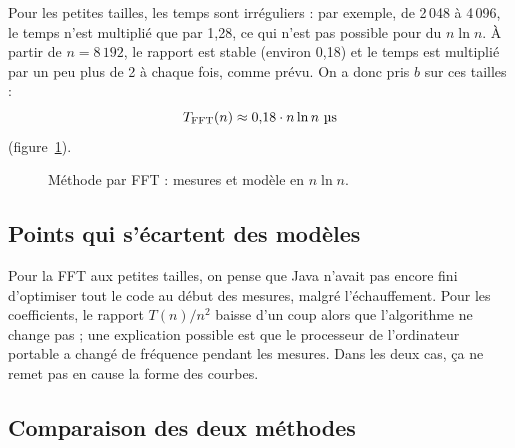 \documentclass[11pt,a4paper]{article}
\begin{document}
Pour les petites tailles, les temps sont irréguliers : par exemple, de 2\,048 à
4\,096, le temps n'est multiplié que par 1,28, ce qui n'est pas possible pour du
$n \ln n$. À partir de $n = 8\,192$, le rapport est stable (environ 0,18) et le temps
est multiplié par un peu plus de 2 à chaque fois, comme prévu. On a donc pris $b$ sur
ces tailles :
\[
  T_{\text{FFT}}(n) \approx 0{,}18 \cdot n \ln n \ \text{\textmu s}
\]
(figure~\ref{fig:fft}).

\begin{figure}[H]
\centering
{}
\caption{Méthode par FFT : mesures et modèle en $n \ln n$.}
\label{fig:fft}
\end{figure}

\subsection{Points qui s'écartent des modèles}
\label{sec:ecarts}

Pour la FFT aux petites tailles, on pense que Java n'avait pas encore fini
d'optimiser tout le code au début des mesures, malgré l'échauffement. Pour les
coefficients, le rapport $T(n)/n^2$ baisse d'un coup alors que l'algorithme ne
change pas ; une explication possible est que le processeur de l'ordinateur portable
a changé de fréquence pendant les mesures. Dans les deux cas, ça ne remet pas en
cause la forme des courbes.

\subsection{Comparaison des deux méthodes}
\end{document}
